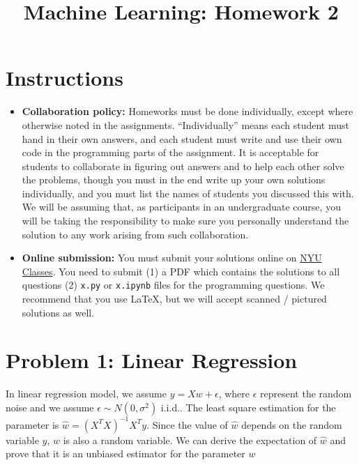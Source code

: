 \documentclass{article}
\title{
  Machine Learning: Homework 2\\
  \vspace{0.2cm}
}
\date{}
\author{}
\begin{document}
\maketitle

\section*{Instructions}
\begin{itemize}
\item {\bf Collaboration policy:} Homeworks must be done individually,
  except where otherwise noted in the assignments. ``Individually''
  means each student must hand in their own answers, and each student
  must write and use their own code in the programming parts of the
  assignment. It is acceptable for students to collaborate in figuring
  out answers and to help each other solve the problems, though you
  must in the end write up your own solutions individually, and you
  must list the names of students you discussed this with.  We will be
  assuming that, as participants in an undergraduate course, you will be
  taking the responsibility to make sure you personally understand the
  solution to any work arising from such collaboration.
\item {\bf Online submission:} You must submit your solutions online
  on
  \href{https://newclasses.nyu.edu}{NYU Classes}. You need to submit (1) a PDF which contains the solutions to all 
  questions (2) \texttt{x.py} or \texttt{x.ipynb} files for the programming questions. 
  We recommend that you use \LaTeX{}, but we will accept scanned / pictured
  solutions as well. 
\end{itemize}



\section*{Problem 1: Linear Regression}

In linear regression model, we assume $y = Xw+\epsilon$, where $\epsilon$ represent the random noise and we assume $\epsilon \sim N(0, \sigma^2)$ i.i.d..  The least square estimation for the parameter is $\hat{w} = (X^TX)^{-1} X^Ty$. Since the value of $\hat{w}$ depends on the random variable $y$, $\hat{w}$ is also a random variable. We can derive the expectation of $\hat{w}$ and prove that it is an unbiased estimator for the parameter $w$
\end{document}
